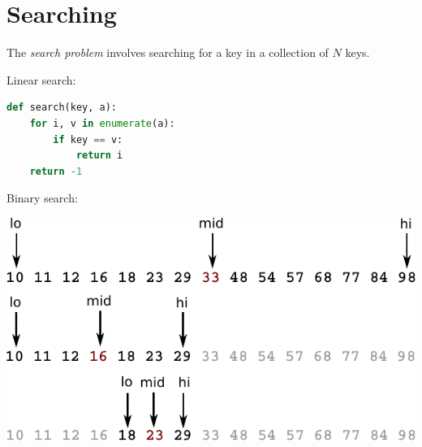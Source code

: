 \documentclass[8pt,a4paper,compress,handout]{beamer}
\begin{document}
\section{Searching}
\begin{frame}[fragile]
The \emph{search problem} involves searching for a key in a collection of $N$ keys.

\bigskip

Linear search:
\begin{lstlisting}[language=Python]
def search(key, a):
    for i, v in enumerate(a):
        if key == v:
            return i
    return -1
\end{lstlisting}

\bigskip

Binary search:

\begin{minipage}{150pt}
\begin{center}
\includegraphics[scale=0.4]{./figures/bs1.pdf}

\smallskip


\end{center}
\end{minipage}
\end{frame}
\end{document}
